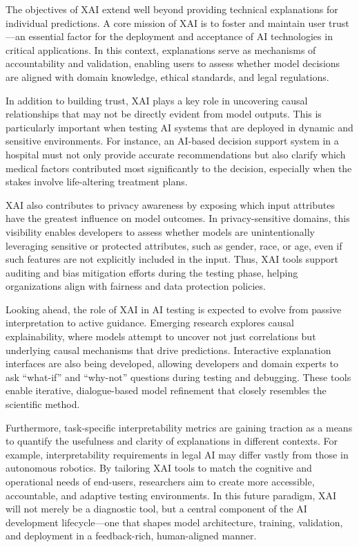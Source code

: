 \documentclass[manuscript,screen,review]{acmart}
\begin{document}
The objectives of XAI extend well beyond providing technical explanations for individual predictions. A core mission of XAI is to foster and maintain user trust---an essential factor for the deployment and acceptance of AI technologies in critical applications. In this context, explanations serve as mechanisms of accountability and validation, enabling users to assess whether model decisions are aligned with domain knowledge, ethical standards, and legal regulations.

In addition to building trust, XAI plays a key role in uncovering causal relationships that may not be directly evident from model outputs. This is particularly important when testing AI systems that are deployed in dynamic and sensitive environments. For instance, an AI-based decision support system in a hospital must not only provide accurate recommendations but also clarify which medical factors contributed most significantly to the decision, especially when the stakes involve life-altering treatment plans.

XAI also contributes to privacy awareness by exposing which input attributes have the greatest influence on model outcomes. In privacy-sensitive domains, this visibility enables developers to assess whether models are unintentionally leveraging sensitive or protected attributes, such as gender, race, or age, even if such features are not explicitly included in the input. Thus, XAI tools support auditing and bias mitigation efforts during the testing phase, helping organizations align with fairness and data protection policies.

Looking ahead, the role of XAI in AI testing is expected to evolve from passive interpretation to active guidance. Emerging research explores causal explainability, where models attempt to uncover not just correlations but underlying causal mechanisms that drive predictions. Interactive explanation interfaces are also being developed, allowing developers and domain experts to ask ``what-if'' and ``why-not'' questions during testing and debugging. These tools enable iterative, dialogue-based model refinement that closely resembles the scientific method.

Furthermore, task-specific interpretability metrics are gaining traction as a means to quantify the usefulness and clarity of explanations in different contexts. For example, interpretability requirements in legal AI may differ vastly from those in autonomous robotics. By tailoring XAI tools to match the cognitive and operational needs of end-users, researchers aim to create more accessible, accountable, and adaptive testing environments. In this future paradigm, XAI will not merely be a diagnostic tool, but a central component of the AI development lifecycle---one that shapes model architecture, training, validation, and deployment in a feedback-rich, human-aligned manner.
\end{document}
